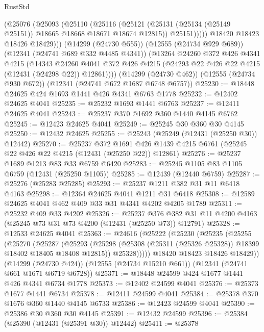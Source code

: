 \begin{lexlean}{RustStd}
\begin{coremodule}
              (@25076
                (@25093
                  (@25110
                    (@25116
                      (@25121 (@25131 (@25134 (@25149 @25151)) @18665 @18668 @18671 @18674 @12815))
                      @25151)))))
            @18420
            @18423
            @18426
            @18429)))
      (@14299 (@24730 @555))
      (@12555 (@24734 @929 @689))
      (@12341 (@24741 @689 @332 @4485 @4341))
      (@13264
        @24260
        @372
        @426
        @4341
        @4215
        (@14343
          @24260
          @4041
          @372
          @426
          @4215
          (@24293 @22 @426 @22 @4215 (@12431 (@24298 @22)) @12861))))
    (@14299 (@24730 @462))
    (@12555 (@24734 @930 @672))
    (@12341 (@24741 @672 @1687 @6748 @6757))
@25230 := @18448 @24625 @424 @1693 @1441 @426 @4341 @6763 @1778
@25232 := @12402 @24625 @4041
@25235 := @25232 @1693 @1441 @6763
@25237 := @12411 @24625 @4041
@25243 := @25237 @370 @1692 @360 @1440 @4145 @6762
@25245 := @12423 @24625 @4041
@25249 := @25245 @30 @360 @30 @4145
@25250 := @12432 @24625
@25255 := @25243 (@25249 (@12431 (@25250 @30)) @12442)
@25270 := @25237
    @372
    @1691
    @426
    @1439
    @4215
    @6761
    (@25245 @22 @426 @22 @4215 (@12431 (@25250 @22)) @12861)
@25276 := @25237 @1689 @1213 @83 @33 @6759 @6420
@25283 := @25245 @1105 @83 @1105 @6759 (@12431 (@25250 @1105))
@25285 := @12439 (@12440 @6759)
@25287 := @25276 (@25283 @25285)
@25293 := @25237 @1211 @382 @31 @11 @6418 @4163
@25298 := @12364 @24625 @4041 @1211 @31 @6418
@25308 := @12589 @24625 @4041 @462 @409 @33 @31 @4341 @4202 @4205 @1789
@25311 := @25232 @409 @33 @4202
@25326 := @25237
    @376
    @382
    @31
    @11
    @4200
    @4163
    (@25245 @73 @31 @73 @4200 (@12431 (@25250 @73)) @12791)
@25328 := @12533 @24625 @4041
@25363 := @24616
    (@25222
      (@25230
        (@25235
          (@25255
            (@25270
              (@25287
                (@25293
                  (@25298 (@25308 (@25311 (@25326 @25328)) @18399 @18402 @18405 @18408 @12815))
                  @25328)))))
        @18420
        @18423
        @18426
        @18429))
    (@14299 (@24730 @424))
    (@12555 (@24734 @15210 @661))
    (@12341 (@24741 @661 @1671 @6719 @6728))
@25371 := @18448 @24599 @424 @1677 @1441 @426 @4341 @6734 @1778
@25373 := @12402 @24599 @4041
@25376 := @25373 @1677 @1441 @6734
@25378 := @12411 @24599 @4041
@25384 := @25378 @370 @1676 @360 @1440 @4145 @6733
@25386 := @12423 @24599 @4041
@25390 := @25386 @30 @360 @30 @4145
@25391 := @12432 @24599
@25396 := @25384 (@25390 (@12431 (@25391 @30)) @12442)
@25411 := @25378

\end{coremodule}
\end{lexlean}
